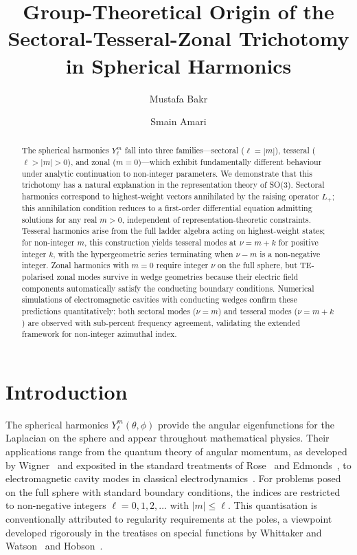 \documentclass[
  aip,
  amsmath,amssymb,
  preprint
]{revtex4-1}
\begin{document}
\raggedbottom


\title{Group-Theoretical Origin of the Sectoral-Tesseral-Zonal Trichotomy in Spherical Harmonics}

\author{Mustafa Bakr}
\author{Smain Amari}


\begin{abstract}
The spherical harmonics $Y_\ell^m$ fall into three families---sectoral ($\ell = |m|$), tesseral ($\ell > |m| > 0$), and zonal ($m = 0$)---which exhibit fundamentally different behaviour under analytic continuation to non-integer parameters. We demonstrate that this trichotomy has a natural explanation in the representation theory of SO(3). Sectoral harmonics correspond to highest-weight vectors annihilated by the raising operator $L_+$; this annihilation condition reduces to a first-order differential equation admitting solutions for any real $m > 0$, independent of representation-theoretic constraints. Tesseral harmonics arise from the full ladder algebra acting on highest-weight states; for non-integer $m$, this construction yields tesseral modes at $\nu = m + k$ for positive integer $k$, with the hypergeometric series terminating when $\nu - m$ is a non-negative integer. Zonal harmonics with $m = 0$ require integer $\nu$ on the full sphere, but TE-polarised zonal modes survive in wedge geometries because their electric field components automatically satisfy the conducting boundary conditions. Numerical simulations of electromagnetic cavities with conducting wedges confirm these predictions quantitatively: both sectoral modes ($\nu = m$) and tesseral modes ($\nu = m + k$) are observed with sub-percent frequency agreement, validating the extended framework for non-integer azimuthal index.
\end{abstract}



\maketitle


\section{Introduction}

The spherical harmonics $Y_\ell^m(\theta, \phi)$ provide the angular eigenfunctions for the Laplacian on the sphere and appear throughout mathematical physics. Their applications range from the quantum theory of angular momentum, as developed by Wigner~\cite{Wigner1959} and exposited in the standard treatments of Rose~\cite{Rose1957} and Edmonds~\cite{Edmonds1957}, to electromagnetic cavity modes in classical electrodynamics~\cite{Stratton1941,Jackson1999}. For problems posed on the full sphere with standard boundary conditions, the indices are restricted to non-negative integers $\ell = 0, 1, 2, \ldots$ with $|m| \leq \ell$. This quantisation is conventionally attributed to regularity requirements at the poles, a viewpoint developed rigorously in the treatises on special functions by Whittaker and Watson~\cite{WhittakerWatson1927} and Hobson~\cite{Hobson1931}.
\end{document}

